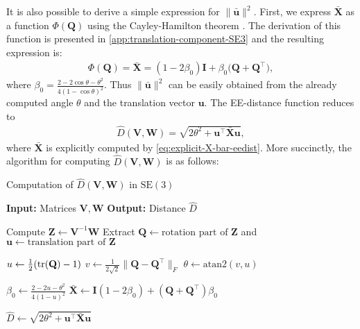 It is also possible to derive a simple expression for $\|\bar{\mathbf{u}}\|^2$. First, we express $\bar{\mathbf{X}}$ as a function $\Phi(\mathbf{Q})$ using the Cayley-Hamilton theorem \citep[p. 63]{Chen2009}. The derivation of this function is presented in \cref{app:translation-component-SE3} and the resulting expression is:
\begin{align}
    \Phi(\mathbf{Q}) = \bar{\mathbf{X}} = (1-2\beta_0)\mathbf{I} + \beta_0\bigl(\mathbf{Q} + \mathbf{Q}^\top\bigr), \label{eq:explicit-X-bar-eedist}
\end{align}
where $\beta_0=\frac{2-2\cos\theta-\theta^2}{4(1 - \cos\theta)^2}$. Thus $\|\bar{\mathbf{u}}\|^2$ can be easily obtained from the already computed angle $\theta$ and the translation vector $\mathbf{u}$. The EE-distance function reduces to
\begin{align}
    \widehat{D}(\mathbf{V}, \mathbf{W}) = \sqrt{2\theta^2 + \mathbf{u}^\top\bar{\mathbf{X}}\mathbf{u}}, \label{eq:explicit-EE-distance-SE3}
\end{align}
where $\bar{\mathbf{X}}$ is explicitly computed by \eqref{eq:explicit-X-bar-eedist}. More succinctly, the algorithm for computing $\widehat{D}(\mathbf{V}, \mathbf{W})$ is as follows:
\begin{algorithm}
    \caption{Computation of $\widehat{D}(\mathbf{V}, \mathbf{W})$ in $\text{SE}(3)$}
    \begin{algorithmic}[1]\label{alg:dhat-se3}
        \Statex \textbf{Input:} Matrices $\mathbf{V}, \mathbf{W}$
        \Statex \textbf{Output:} Distance $\widehat{D}$
        
        \State Compute $\mathbf{Z} \gets \mathbf{V}^{-1}\mathbf{W}$
        \State Extract $\mathbf{Q} \gets \text{rotation part of } \mathbf{Z}$ and $\mathbf{u} \gets \text{translation part of } \mathbf{Z}$

        \State $u \gets \frac{1}{2} (\operatorname{tr}(\mathbf{Q}) - 1)$
        \State $v \gets \frac{1}{2\sqrt{2}} \|\mathbf{Q} - \mathbf{Q}^\top\|_F$
        \State $\theta \gets \text{atan2}(v, u)$

        \State $\beta_0 \gets \frac{2 - 2u - \theta^2}{4(1 - u)^2}$
        \State $\bar{\mathbf{X}} \gets \mathbf{I}(1 - 2\beta_0) + (\mathbf{Q} + \mathbf{Q}^\top)\beta_0$

        \State $\widehat{D} \gets \sqrt{2\theta^2 + \mathbf{u}^\top \bar{\mathbf{X}} \mathbf{u}}$
    \end{algorithmic}
\end{algorithm}


